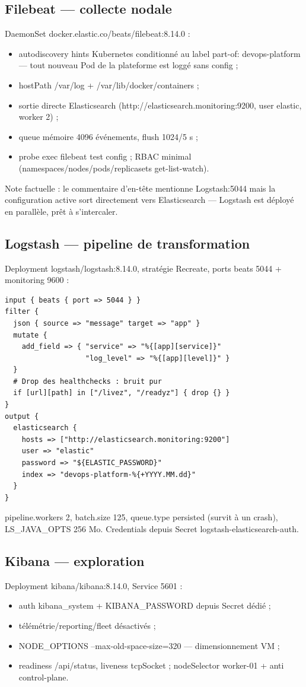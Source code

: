 \documentclass[12pt,a4paper]{article}
\begin{document}
\subsection{Filebeat --- collecte nodale}
DaemonSet docker.elastic.co/beats/filebeat:8.14.0 :
\begin{itemize}[itemsep=1pt]
  \item autodiscovery hints Kubernetes conditionné au label part-of: devops-platform --- tout nouveau Pod de la plateforme est loggé sans config ;
  \item hostPath /var/log + /var/lib/docker/containers ;
  \item sortie directe Elasticsearch (http://elasticsearch.monitoring:9200, user elastic, worker 2) ;
  \item queue mémoire 4096 événements, flush 1024/5 s ;
  \item probe exec filebeat test config ; RBAC minimal (namespaces/nodes/pods/replicasets get-list-watch).
\end{itemize}

Note factuelle : le commentaire d'en-tête mentionne Logstash:5044 mais la configuration active sort directement vers Elasticsearch --- Logstash est déployé en parallèle, prêt à s'intercaler.

\subsection{Logstash --- pipeline de transformation}
Deployment logstash/logstash:8.14.0, stratégie Recreate, ports beats 5044 + monitoring 9600 :
\begin{lstlisting}[caption={Pipeline Logstash --- filtrage et enrichissement}]
input { beats { port => 5044 } }
filter {
  json { source => "message" target => "app" }
  mutate {
    add_field => { "service" => "%{[app][service]}"
                   "log_level" => "%{[app][level]}" }
  }
  # Drop des healthchecks : bruit pur
  if [url][path] in ["/livez", "/readyz"] { drop {} }
}
output {
  elasticsearch {
    hosts => ["http://elasticsearch.monitoring:9200"]
    user => "elastic"
    password => "${ELASTIC_PASSWORD}"
    index => "devops-platform-%{+YYYY.MM.dd}"
  }
}
\end{lstlisting}

pipeline.workers 2, batch.size 125, queue.type persisted (survit à un crash), LS\_JAVA\_OPTS 256 Mo. Credentials depuis Secret logstash-elasticsearch-auth.

\subsection{Kibana --- exploration}
Deployment kibana/kibana:8.14.0, Service 5601 :
\begin{itemize}[itemsep=1pt]
  \item auth kibana\_system + KIBANA\_PASSWORD depuis Secret dédié ;
  \item télémétrie/reporting/fleet désactivés ;
  \item NODE\_OPTIONS --max-old-space-size=320 --- dimensionnement VM ;
  \item readiness /api/status, liveness tcpSocket ; nodeSelector worker-01 + anti control-plane.
\end{itemize}
\end{document}
